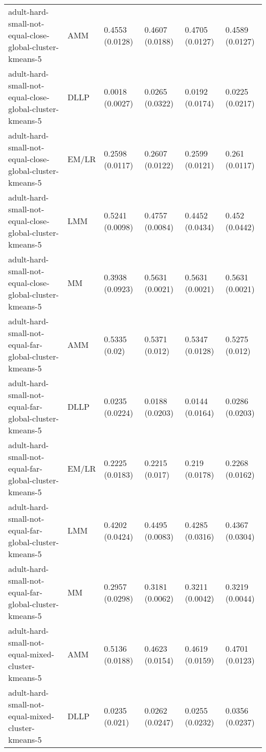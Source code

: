 \begin{longtable}{llllll}
                               adult-hard-small-not-equal-close-global-cluster-kmeans-5 &       AMM & 0.4553 (0.0128) &  0.4607 (0.0188) &   0.4705 (0.0127) &     0.4589 (0.0127) \\
                               adult-hard-small-not-equal-close-global-cluster-kmeans-5 &      DLLP & 0.0018 (0.0027) &  0.0265 (0.0322) &   0.0192 (0.0174) &     0.0225 (0.0217) \\
                               adult-hard-small-not-equal-close-global-cluster-kmeans-5 &     EM/LR & 0.2598 (0.0117) &  0.2607 (0.0122) &   0.2599 (0.0121) &      0.261 (0.0117) \\
                               adult-hard-small-not-equal-close-global-cluster-kmeans-5 &       LMM & 0.5241 (0.0098) &  0.4757 (0.0084) &   0.4452 (0.0434) &      0.452 (0.0442) \\
                               adult-hard-small-not-equal-close-global-cluster-kmeans-5 &        MM & 0.3938 (0.0923) &  0.5631 (0.0021) &   0.5631 (0.0021) &     0.5631 (0.0021) \\
                                 adult-hard-small-not-equal-far-global-cluster-kmeans-5 &       AMM &   0.5335 (0.02) &   0.5371 (0.012) &   0.5347 (0.0128) &      0.5275 (0.012) \\
                                 adult-hard-small-not-equal-far-global-cluster-kmeans-5 &      DLLP & 0.0235 (0.0224) &  0.0188 (0.0203) &   0.0144 (0.0164) &     0.0286 (0.0203) \\
                                 adult-hard-small-not-equal-far-global-cluster-kmeans-5 &     EM/LR & 0.2225 (0.0183) &   0.2215 (0.017) &    0.219 (0.0178) &     0.2268 (0.0162) \\
                                 adult-hard-small-not-equal-far-global-cluster-kmeans-5 &       LMM & 0.4202 (0.0424) &  0.4495 (0.0083) &   0.4285 (0.0316) &     0.4367 (0.0304) \\
                                 adult-hard-small-not-equal-far-global-cluster-kmeans-5 &        MM & 0.2957 (0.0298) &  0.3181 (0.0062) &   0.3211 (0.0042) &     0.3219 (0.0044) \\
                                      adult-hard-small-not-equal-mixed-cluster-kmeans-5 &       AMM & 0.5136 (0.0188) &  0.4623 (0.0154) &   0.4619 (0.0159) &     0.4701 (0.0123) \\
                                      adult-hard-small-not-equal-mixed-cluster-kmeans-5 &      DLLP &  0.0235 (0.021) &  0.0262 (0.0247) &   0.0255 (0.0232) &     0.0356 (0.0237) \\

\end{longtable}
